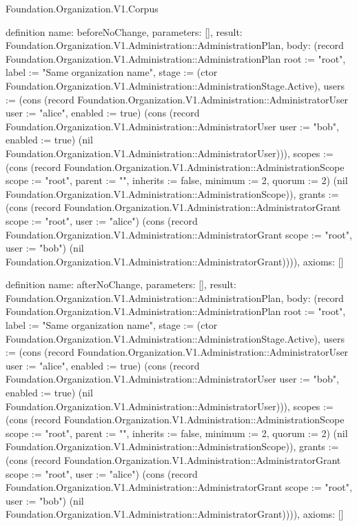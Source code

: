 \begin{lexlean}{Foundation.Organization.V1.Corpus}
\begin{semanticmodule}
definition{
  name: beforeNoChange,
  parameters: [],
  result: Foundation.Organization.V1.Administration::AdministrationPlan,
  body: (record Foundation.Organization.V1.Administration::AdministrationPlan {root := "root", label := "Same organization name", stage := (ctor Foundation.Organization.V1.Administration::AdministrationStage.Active), users := (cons (record Foundation.Organization.V1.Administration::AdministratorUser {user := "alice", enabled := true}) (cons (record Foundation.Organization.V1.Administration::AdministratorUser {user := "bob", enabled := true}) (nil Foundation.Organization.V1.Administration::AdministratorUser))), scopes := (cons (record Foundation.Organization.V1.Administration::AdministrationScope {scope := "root", parent := "", inherits := false, minimum := 2, quorum := 2}) (nil Foundation.Organization.V1.Administration::AdministrationScope)), grants := (cons (record Foundation.Organization.V1.Administration::AdministratorGrant {scope := "root", user := "alice"}) (cons (record Foundation.Organization.V1.Administration::AdministratorGrant {scope := "root", user := "bob"}) (nil Foundation.Organization.V1.Administration::AdministratorGrant)))}),
  axioms: []
}

definition{
  name: afterNoChange,
  parameters: [],
  result: Foundation.Organization.V1.Administration::AdministrationPlan,
  body: (record Foundation.Organization.V1.Administration::AdministrationPlan {root := "root", label := "Same organization name", stage := (ctor Foundation.Organization.V1.Administration::AdministrationStage.Active), users := (cons (record Foundation.Organization.V1.Administration::AdministratorUser {user := "alice", enabled := true}) (cons (record Foundation.Organization.V1.Administration::AdministratorUser {user := "bob", enabled := true}) (nil Foundation.Organization.V1.Administration::AdministratorUser))), scopes := (cons (record Foundation.Organization.V1.Administration::AdministrationScope {scope := "root", parent := "", inherits := false, minimum := 2, quorum := 2}) (nil Foundation.Organization.V1.Administration::AdministrationScope)), grants := (cons (record Foundation.Organization.V1.Administration::AdministratorGrant {scope := "root", user := "alice"}) (cons (record Foundation.Organization.V1.Administration::AdministratorGrant {scope := "root", user := "bob"}) (nil Foundation.Organization.V1.Administration::AdministratorGrant)))}),
  axioms: []
}


\end{semanticmodule}
\end{lexlean}
